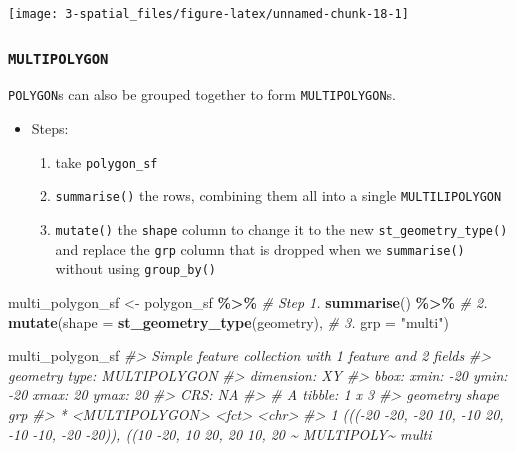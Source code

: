 \documentclass[
]{report}
\newenvironment{Shaded}{\begin{snugshade}}{\end{snugshade}}
\newcommand{\CommentTok}[1]{\textcolor[rgb]{0.56,0.35,0.01}{\textit{#1}}}
\newcommand{\DataTypeTok}[1]{\textcolor[rgb]{0.13,0.29,0.53}{#1}}
\newcommand{\KeywordTok}[1]{\textcolor[rgb]{0.13,0.29,0.53}{\textbf{#1}}}
\newcommand{\NormalTok}[1]{#1}
\newcommand{\OperatorTok}[1]{\textcolor[rgb]{0.81,0.36,0.00}{\textbf{#1}}}
\newcommand{\StringTok}[1]{\textcolor[rgb]{0.31,0.60,0.02}{#1}}
\providecommand{\tightlist}{%
  \setlength{\itemsep}{0pt}\setlength{\parskip}{0pt}}
\begin{document}
\begin{center}\texttt{[image: 3-spatial\_files/figure-latex/unnamed-chunk-18-1]} \end{center}

\hypertarget{multipolygon}{%
\subsubsection{\texorpdfstring{\texttt{MULTIPOLYGON}}{MULTIPOLYGON}}\label{multipolygon}}

\texttt{POLYGON}s can also be grouped together to form \texttt{MULTIPOLYGON}s.

\begin{itemize}
\tightlist
\item
  Steps:

  \begin{enumerate}
  \def\labelenumi{\arabic{enumi}.}
  \tightlist
  \item
    take \texttt{polygon\_sf}
  \item
    \texttt{summarise()} the rows, combining them all into a single \texttt{MULTILIPOLYGON}
  \item
    \texttt{mutate()} the \texttt{shape} column to change it to the new \texttt{st\_geometry\_type()} and replace the \texttt{grp} column that is dropped when we \texttt{summarise()} without using \texttt{group\_by()}
  \end{enumerate}
\end{itemize}

\begin{Shaded}
\begin{Highlighting}[]
\NormalTok{multi\_polygon\_sf \textless{}{-}}\StringTok{ }\NormalTok{polygon\_sf }\OperatorTok{\%\textgreater{}\%}\StringTok{           }\CommentTok{\# Step 1.}
\StringTok{  }\KeywordTok{summarise}\NormalTok{() }\OperatorTok{\%\textgreater{}\%}\StringTok{                            }\CommentTok{\# 2.}
\StringTok{  }\KeywordTok{mutate}\NormalTok{(}\DataTypeTok{shape =} \KeywordTok{st\_geometry\_type}\NormalTok{(geometry), }\CommentTok{\# 3.}
         \DataTypeTok{grp =} \StringTok{"multi"}\NormalTok{)}

\NormalTok{multi\_polygon\_sf}
\CommentTok{\#\textgreater{} Simple feature collection with 1 feature and 2 fields}
\CommentTok{\#\textgreater{} geometry type:  MULTIPOLYGON}
\CommentTok{\#\textgreater{} dimension:      XY}
\CommentTok{\#\textgreater{} bbox:           xmin: {-}20 ymin: {-}20 xmax: 20 ymax: 20}
\CommentTok{\#\textgreater{} CRS:            NA}
\CommentTok{\#\textgreater{} \# A tibble: 1 x 3}
\CommentTok{\#\textgreater{}                                                                       geometry shape      grp  }
\CommentTok{\#\textgreater{} *                                                               \textless{}MULTIPOLYGON\textgreater{} \textless{}fct\textgreater{}      \textless{}chr\textgreater{}}
\CommentTok{\#\textgreater{} 1 ((({-}20 {-}20, {-}20 10, {-}10 20, {-}10 {-}10, {-}20 {-}20)), ((10 {-}20, 10 20, 20 10, 20 \textasciitilde{} MULTIPOLY\textasciitilde{} multi}
\end{Highlighting}
\end{Shaded}
\end{document}
